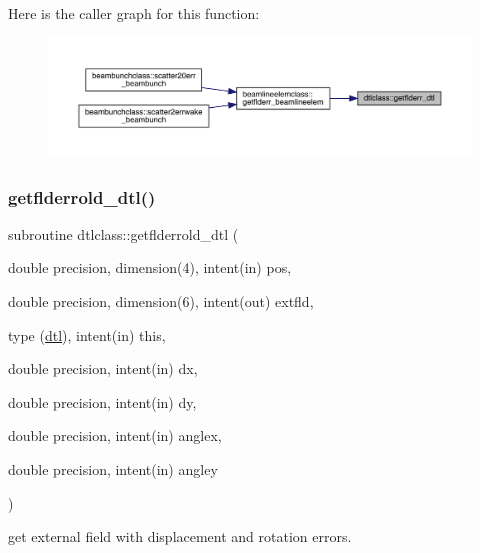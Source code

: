 Here is the caller graph for this function\+:\nopagebreak
\begin{figure}[H]
\begin{center}
\leavevmode
\includegraphics[width=350pt]{namespacedtlclass_ab866f108c00b307f9e7a55731eadafa4_icgraph}
\end{center}
\end{figure}
\mbox{\label{namespacedtlclass_aa42e9d402234d9be025275b620c42326}} 
\subsubsection{\texorpdfstring{getflderrold\_dtl()}{getflderrold\_dtl()}}
{\footnotesize\ttfamily subroutine dtlclass\+::getflderrold\+\_\+dtl (\begin{DoxyParamCaption}\item[{double precision, dimension(4), intent(in)}]{pos,  }\item[{double precision, dimension(6), intent(out)}]{extfld,  }\item[{type (\mbox{\hyperlink{namespacedtlclass_structdtlclass_1_1dtl}{dtl}}), intent(in)}]{this,  }\item[{double precision, intent(in)}]{dx,  }\item[{double precision, intent(in)}]{dy,  }\item[{double precision, intent(in)}]{anglex,  }\item[{double precision, intent(in)}]{angley }\end{DoxyParamCaption})}



get external field with displacement and rotation errors. 

\mbox{\label{namespacedtlclass_a34e4fef41e0eab9b94f596f73059c2b7}} 
